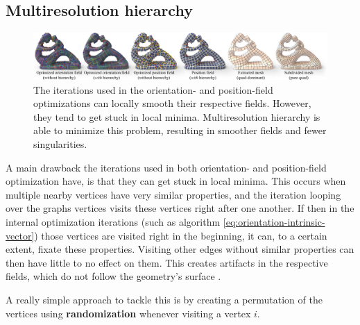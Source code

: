 \documentclass{ACGSeminar}
\begin{document}
\subsection{Multiresolution hierarchy}
\begin{figure}[htb!]
	\begin{centering}
		\includegraphics[width=\textwidth]{img/multiresolution-hierarchy.png}\par
	\end{centering}
	\caption{The iterations used in the orientation- and position-field optimizations can locally smooth their respective fields. However, they tend to get stuck in local minima. Multiresolution hierarchy is able to minimize this problem, resulting in smoother fields and fewer singularities. \cite{jakob2015instant}}
	\label{fig:multireolution-hierarchy}
\end{figure}

A main drawback the iterations used in both orientation- and position-field optimization have, is that they can get stuck in local minima. This occurs when multiple nearby vertices have very similar properties, and the iteration looping over the graphs vertices visits these vertices right after one another. If then in the internal optimization iterations (such as algorithm \eqref{eq:orientation-intrinsic-vector}) those vertices are visited right in the beginning, it can, to a certain extent, fixate these properties. Visiting other edges without similar properties can then have little to no effect on them.  This creates artifacts in the respective fields, which do not follow the geometry's surface \cite{jakob2015instant}. \bigskip

A really simple approach to tackle this is by creating a permutation of the vertices using \textbf{randomization} whenever visiting a vertex $i$.
\end{document}
